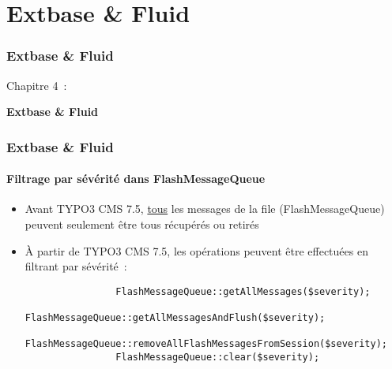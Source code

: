 %

\section{Extbase \& Fluid}
\begin{frame}[fragile]
	\frametitle{Extbase \& Fluid}

	\begin{center}\huge{Chapitre 4~:}\end{center}
	\begin{center}\huge{\color{typo3darkgrey}\textbf{Extbase \& Fluid}}\end{center}

\end{frame}


\begin{frame}[fragile]
	\frametitle{Extbase \& Fluid}
	\framesubtitle{Filtrage par sévérité dans FlashMessageQueue}

	\begin{itemize}

		\item Avant TYPO3 CMS 7.5, \underline{tous} les messages de la file (FlashMessageQueue) peuvent
			seulement être tous récupérés ou retirés

		\item À partir de TYPO3 CMS 7.5, les opérations peuvent être effectuées en filtrant par sévérité~:

			\begin{lstlisting}
				FlashMessageQueue::getAllMessages($severity);
				FlashMessageQueue::getAllMessagesAndFlush($severity);
				FlashMessageQueue::removeAllFlashMessagesFromSession($severity);
				FlashMessageQueue::clear($severity);
			\end{lstlisting}

	\end{itemize}

\end{frame}

